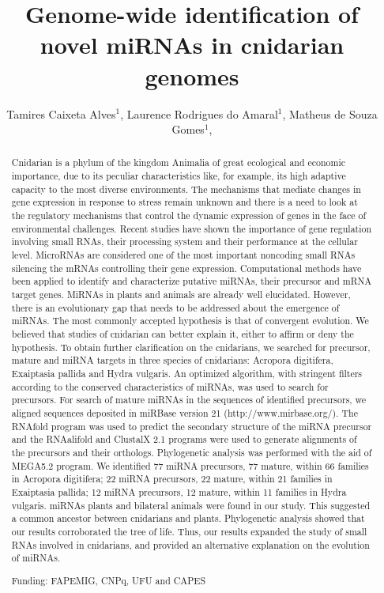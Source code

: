 \documentclass[twoside]{article}
\title{\vspace{-15mm}\fontsize{24pt}{10pt}\selectfont\textbf{ Genome-wide identification of novel miRNAs in cnidarian genomes }} %
\author{ Tamires Caixeta Alves$^{1}$, Laurence Rodrigues do Amaral$^{1}$, Matheus de Souza Gomes$^{1}$, }
\affil{ 1 UFU

 }
\date{}
\begin{document}
  
  
  \maketitle %
  
  
  \thispagestyle{fancy} %
  
  
  \begin{abstract}
  Cnidarian is a phylum of the kingdom Animalia of great ecological and economic importance, due to its peculiar characteristics like, for example, its high adaptive capacity to the most diverse environments. The mechanisms that mediate changes in gene expression in response to stress remain unknown and there is a need to look at the regulatory mechanisms that control the dynamic expression of genes in the face of environmental challenges. Recent studies have shown the importance of gene regulation involving small RNAs, their processing system and their performance at the cellular level. MicroRNAs are considered one of the most important noncoding small RNAs silencing the mRNAs controlling their gene expression. Computational methods have been applied to identify and characterize putative miRNAs, their precursor and mRNA target genes. MiRNAs in plants and animals are already well elucidated. However, there is an evolutionary gap that needs to be addressed about the emergence of miRNAs. The most commonly accepted hypothesis is that of convergent evolution. We believed that studies of cnidarian can better explain it, either to affirm or deny the hypothesis. To obtain further clarification on the cnidarians, we searched for precursor, mature and miRNA targets in three species of cnidarians: Acropora digitifera, Exaiptasia pallida and Hydra vulgaris. An optimized algorithm, with stringent filters according to the conserved characteristics of miRNAs, was used to search for precursors. For search of mature miRNAs in the sequences of identified precursors, we aligned sequences deposited in miRBase version 21 (http://www.mirbase.org/). The RNAfold program was used to predict the secondary structure of the miRNA precursor and the RNAalifold and ClustalX 2.1 programs were used to generate alignments of the precursors and their orthologs. Phylogenetic analysis was performed with the aid of MEGA5.2 program. We identified 77 miRNA precursors, 77 mature, within 66 families in Acropora digitifera; 22 miRNA precursors, 22 mature, within 21 families in Exaiptasia pallida; 12 miRNA precursors, 12 mature, within 11 families in Hydra vulgaris. miRNAs plants and bilateral animals were found in our study. This suggested a common ancestor between cnidarians and plants. Phylogenetic analysis showed that our results corroborated the tree of life. Thus, our results expanded the study of small RNAs involved in cnidarians, and provided an alternative explanation on the evolution of miRNAs.
  
  Funding: FAPEMIG, CNPq, UFU and CAPES \\ 
  \end{abstract}
  
\end{document}
